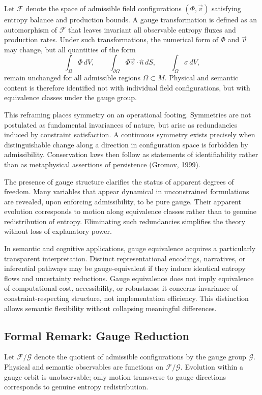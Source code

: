 \documentclass[11pt]{article}
\begin{document}
Let $\mathcal{F}$ denote the space of admissible field configurations $(\Phi,\vec{v})$ satisfying entropy balance and production bounds. A gauge transformation is defined as an automorphism of $\mathcal{F}$ that leaves invariant all observable entropy fluxes and production rates. Under such transformations, the numerical form of $\Phi$ and $\vec{v}$ may change, but all quantities of the form
\[
\int_\Omega \Phi \, dV,
\qquad
\int_{\partial \Omega} \Phi \vec{v} \cdot \hat{n} \, dS,
\qquad
\int_\Omega \sigma \, dV,
\]
remain unchanged for all admissible regions $\Omega \subset M$. Physical and semantic content is therefore identified not with individual field configurations, but with equivalence classes under the gauge group.

This reframing places symmetry on an operational footing. Symmetries are not postulated as fundamental invariances of nature, but arise as redundancies induced by constraint satisfaction. A continuous symmetry exists precisely when distinguishable change along a direction in configuration space is forbidden by admissibility. Conservation laws then follow as statements of identifiability rather than as metaphysical assertions of persistence (Gromov, 1999).

The presence of gauge structure clarifies the status of apparent degrees of freedom. Many variables that appear dynamical in unconstrained formulations are revealed, upon enforcing admissibility, to be pure gauge. Their apparent evolution corresponds to motion along equivalence classes rather than to genuine redistribution of entropy. Eliminating such redundancies simplifies the theory without loss of explanatory power.

In semantic and cognitive applications, gauge equivalence acquires a particularly transparent interpretation. Distinct representational encodings, narratives, or inferential pathways may be gauge-equivalent if they induce identical entropy flows and uncertainty reductions. Gauge equivalence does not imply equivalence of computational cost, accessibility, or robustness; it concerns invariance of constraint-respecting structure, not implementation efficiency. This distinction allows semantic flexibility without collapsing meaningful differences.

\subsection*{Formal Remark: Gauge Reduction}

Let $\mathcal{F}/\mathcal{G}$ denote the quotient of admissible configurations by the gauge group $\mathcal{G}$. Physical and semantic observables are functions on $\mathcal{F}/\mathcal{G}$. Evolution within a gauge orbit is unobservable; only motion transverse to gauge directions corresponds to genuine entropy redistribution.
\end{document}
